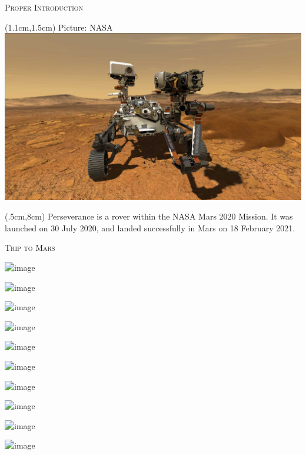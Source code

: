 \documentclass[9pt]{beamer}
\begin{document}
\begin{frame}{\textsc{Proper Introduction}}
\begin{textblock*}{10.5cm}(1.1cm,1.5cm)
{\hfill\footnotesize Picture: NASA} 
\includegraphics[scale=0.25]{assets/Perseverance.jpg}
\end{textblock*}

\begin{textblock*}{12cm}(.5cm,8cm)
Perseverance is a rover within the NASA Mars 2020 Mission. It was launched on 30 July 2020, and landed successfully in Mars on 18 February 2021. 
\end{textblock*}
\end{frame}

\begin{frame}{\textsc{Trip to Mars}}
    \centering

    \includegraphics<1>[width=0.9\textwidth]{assets/animation/animation-0.png}

    \includegraphics<2>[width=0.9\textwidth]{assets/animation/animation-50.png}

    \includegraphics<3>[width=0.9\textwidth]{assets/animation/animation-100.png}

    \includegraphics<4>[width=0.9\textwidth]{assets/animation/animation-150.png}

    \includegraphics<5>[width=0.9\textwidth]{assets/animation/animation-200.png}

    \includegraphics<6>[width=0.9\textwidth]{assets/animation/animation-250.png}

    \includegraphics<7>[width=0.9\textwidth]{assets/animation/animation-300.png}

    \includegraphics<8>[width=0.9\textwidth]{assets/animation/animation-350.png}

    \includegraphics<9>[width=0.9\textwidth]{assets/animation/animation-400.png}

    \includegraphics<10>[width=0.9\textwidth]{assets/animation/animation-411.png}
\end{frame}
\end{document}
